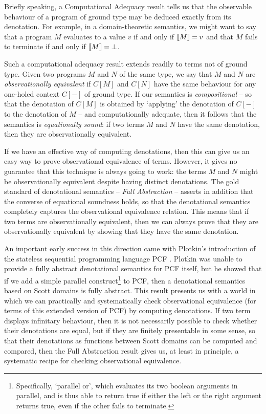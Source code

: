Briefly speaking, a Computational Adequacy result tells us that the observable behaviour of a program of ground type may be deduced exactly from its denotation.
For example, in a domain-theoretic semantics, we might want to say that a program $M$ evaluates to a value $v$ if and only if $\left\llbracket M\right\rrbracket=v$ and that $M$ fails to terminate if and only if $\left\llbracket M\right\rrbracket = \bot$.

Such a computational adequacy result extends readily to terms not of ground type.  
Given two programs $M$ and $N$ of the same type, we say that $M$ and $N$ are \emph{observationally equivalent} if $C[M]$ and $C[N]$ have the same behaviour for any one-holed context $C[-]$ of ground type.
If our semantics is \emph{compositional} -- so that the denotation of $C[M]$ is obtained by `applying' the denotation of $C[-]$ to the denotation of $M$ -- and computationally adequate, then it follows that the semantics is \emph{equationally sound}: if two terms $M$ and $N$ have the same denotation, then they are observationally equivalent.

If we have an effective way of computing denotations, then this can give us an easy way to prove observational equivalence of terms.  
However, it gives no guarantee that this technique is always going to work: the terms $M$ and $N$ might be observationally equivalent despite having distinct denotations.  
The gold standard of denotational semantics -- \emph{Full Abstraction} -- asserts in addition that the converse of equational soundness holds, so that the denotational semantics completely captures the observational equivalence relation.  
This means that if two terms are observationally equivalent, then we can always prove that they are observationally equivalent by showing that they have the same denotation.

An important early success in this direction came with Plotkin's introduction of the stateless sequential programming language PCF \cite{PlotkinPcf}.  
Plotkin was unable to provide a fully abstract denotational semantics for PCF itself, but he showed that if we add a simple parallel construct\footnote{Specifically, `parallel or', which evaluates its two boolean arguments in parallel, and is thus able to return true if either the left or the right argument returns true, even if the other fails to terminate.} to PCF, then a denotational semantics based on Scott domains is fully abstract.  
This result presents us with a world in which we can practically and systematically check observational equivalence (for terms of this extended version of PCF) by computing denotations.  
If two term displays infinitary behaviour, then it is not necessarily possible to check whether their denotations are equal, but if they are finitely presentable in some sense, so that their denotations as functions between Scott domains can be computed and compared, then the Full Abstraction result gives us, at least in principle, a systematic recipe for checking observational equivalence.

